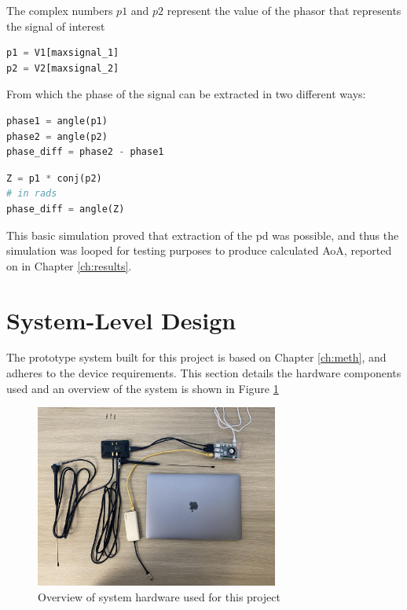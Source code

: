 \documentclass[class=report,11pt,crop=false]{standalone}
\begin{document}
The complex numbers $p1$ and $p2$ represent the value of the phasor that represents the signal of interest

\begin{lstlisting}[language=Python, caption=Phasor extraction of signal of interest]
p1 = V1[maxsignal_1]
p2 = V2[maxsignal_2]
\end{lstlisting}
From which the phase of the signal can be extracted in two different ways:

\noindent\hspace{0.03\linewidth}\begin{minipage}[t]{.48\linewidth}\centering
\begin{lstlisting}[language={Python}, caption={Phase extraction using angle() and \gls{pd}}, label={ls-distance}]
phase1 = angle(p1)
phase2 = angle(p2)
phase_diff = phase2 - phase1
\end{lstlisting}
\end{minipage}%
\hspace{0.5cm}
\begin{minipage}[t]{.4\linewidth}\centering
\begin{lstlisting}[language=Python, caption=\gls{pd} calculation using using conjugate symmetry]
Z = p1 * conj(p2)
# in rads
phase_diff = angle(Z) 
\end{lstlisting}
\end{minipage}

This basic simulation proved that extraction of the \gls{pd} was possible, and thus the simulation was looped for testing purposes to produce calculated \gls{AoA}, reported on in Chapter \ref{ch:results}.


\section{System-Level Design}\label{sec:Design/SystemDesign}
The prototype system built for this project is based on Chapter \ref{ch:meth}, and adheres to the device requirements. This section details the hardware components used and an overview of the system is shown in Figure \ref{fig:system}

\begin{figure}[h]
    \centering
    \includegraphics[width=0.6\linewidth, height=6cm]{Images/diagrams/system.jpg}
    \caption{Overview of system hardware used for this project}
    \label{fig:system}
\end{figure}
\end{document}
